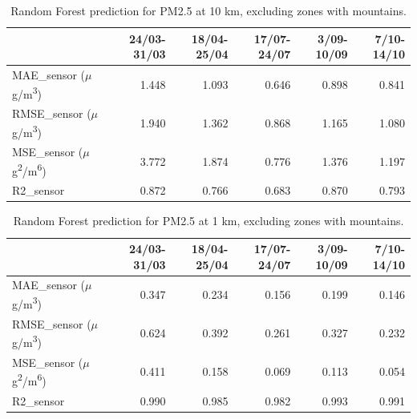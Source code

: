 \begin{table}[H]
\begin{tabular}{lrrrrr}
\toprule
  &  24/03-31/03 &  18/04-25/04 &  17/07-24/07 &  3/09-10/09 &  7/10-14/10 \\
\midrule
  MAE\_sensor ($\mu$g/m\textsuperscript{3}) &        1.448 &        1.093 &        0.646 &       0.898 &       0.841 \\
RMSE\_sensor ($\mu$g/m\textsuperscript{3}) &        1.940 &        1.362 &        0.868 &       1.165 &       1.080 \\
 MSE\_sensor ($\mu$g\textsuperscript{2}/m\textsuperscript{6}) &        3.772 &        1.874 &        0.776 &       1.376 &       1.197 \\
  R2\_sensor  &        0.872 &        0.766 &        0.683 &       0.870 &       0.793 \\
\bottomrule
\end{tabular}
\caption{Random Forest prediction for PM2.5 at 10 km, excluding zones with mountains.}
\label{tab:res10km}
\end{table}
\begin{table}[H]
\begin{tabular}{lrrrrr}
\toprule
  &  24/03-31/03 &  18/04-25/04 &  17/07-24/07 &  3/09-10/09 &  7/10-14/10 \\
\midrule
  MAE\_sensor ($\mu$g/m\textsuperscript{3}) &        0.347 &        0.234 &        0.156 &       0.199 &       0.146 \\
RMSE\_sensor ($\mu$g/m\textsuperscript{3}) &        0.624 &        0.392 &        0.261 &       0.327 &       0.232 \\
 MSE\_sensor ($\mu$g\textsuperscript{2}/m\textsuperscript{6}) &        0.411 &        0.158 &        0.069 &       0.113 &       0.054 \\
  R2\_sensor  &        0.990 &        0.985 &        0.982 &       0.993 &       0.991 \\
\bottomrule
\end{tabular}
\caption{Random Forest prediction for PM2.5 at 1 km, excluding zones with mountains.}
\label{tab:res1km}
\end{table}

